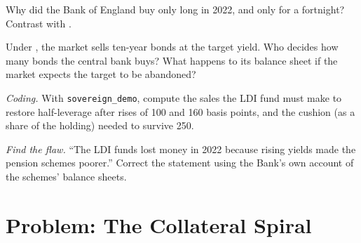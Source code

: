 \begin{exercise}[$\star\star$]\label{exo:m2:european-and-japanese-government-bonds:5}
Why did the Bank of England buy only long  in 2022, and only for a
fortnight? Contrast with .
\end{exercise}

\begin{exercise}[$\star\star$]\label{exo:m2:european-and-japanese-government-bonds:6}
Under , the market sells ten-year bonds at the target
yield. Who decides how many bonds the central bank buys? What happens to its
balance sheet if the market expects the target to be abandoned?
\end{exercise}

\begin{exercise}[$\star\star\star$]\label{exo:m2:european-and-japanese-government-bonds:7}
\emph{Coding.} With \texttt{sovereign\_demo}, compute the sales the LDI fund
must make to restore half-leverage after rises of 100 and 160 basis points,
and the cushion (as a share of the holding) needed to survive 250.
\end{exercise}

\begin{exercise}[$\star\star\star$]\label{exo:m2:european-and-japanese-government-bonds:8}
\emph{Find the flaw.} ``The LDI funds lost money in 2022 because rising yields
made the pension schemes poorer.'' Correct the statement using the Bank's own
account of the schemes' balance sheets.
\end{exercise}

\section{Problem: The Collateral Spiral}

